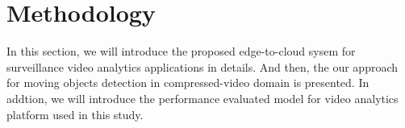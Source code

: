 

\chapter{Methodology}

In this section, we will introduce the proposed edge-to-cloud sysem for surveillance video analytics applications in details. And then, the our approach for moving objects detection in compressed-video domain is presented. In addtion, we will introduce the performance evaluated model for video analytics platform used in this study. 

